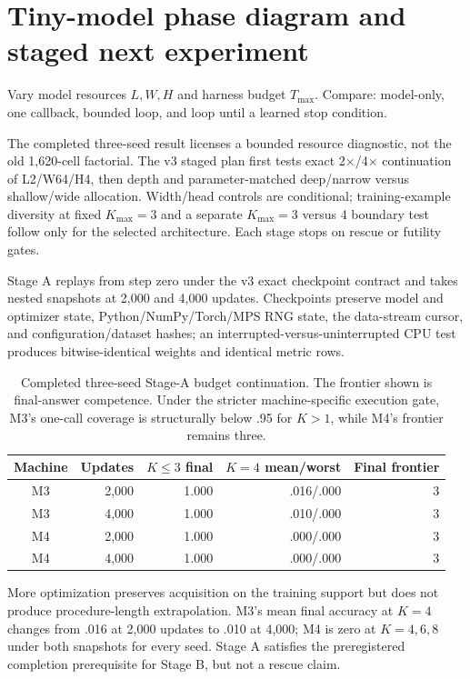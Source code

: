 \documentclass[10pt]{article}
\begin{document}
\section{Tiny-model phase diagram and staged next experiment}
Vary model resources \(L,W,H\) and harness budget \(T_{\max}\). Compare:
model-only, one callback, bounded loop, and loop until a learned stop condition.

The completed three-seed result licenses a bounded resource diagnostic, not the old 1,620-cell factorial. The v3 staged plan first tests exact 2$\times$/4$\times$ continuation of L2/W64/H4, then depth and parameter-matched deep/narrow versus shallow/wide allocation. Width/head controls are conditional; training-example diversity at fixed $K_{\max}=3$ and a separate $K_{\max}=3$ versus 4 boundary test follow only for the selected architecture. Each stage stops on rescue or futility gates.

Stage A replays from step zero under the v3 exact checkpoint contract and takes nested snapshots at 2,000 and 4,000 updates. Checkpoints preserve model and optimizer state, Python/NumPy/Torch/MPS RNG state, the data-stream cursor, and configuration/dataset hashes; an interrupted-versus-uninterrupted CPU test produces bitwise-identical weights and identical metric rows.

\begin{table}[H]\centering\small
\begin{tabular}{crrrr}
\toprule
Machine & Updates & $K\le3$ final & $K=4$ mean/worst & Final frontier\\\midrule
M3 & 2,000 & 1.000 & .016/.000 & 3\\
M3 & 4,000 & 1.000 & .010/.000 & 3\\
M4 & 2,000 & 1.000 & .000/.000 & 3\\
M4 & 4,000 & 1.000 & .000/.000 & 3\\
\bottomrule
\end{tabular}
\caption{Completed three-seed Stage-A budget continuation. The frontier shown is final-answer competence. Under the stricter machine-specific execution gate, M3's one-call coverage is structurally below .95 for $K>1$, while M4's frontier remains three.}
\label{tab:stage-a}
\end{table}

More optimization preserves acquisition on the training support but does not produce procedure-length extrapolation. M3's mean final accuracy at $K=4$ changes from .016 at 2,000 updates to .010 at 4,000; M4 is zero at $K=4,6,8$ under both snapshots for every seed. Stage A satisfies the preregistered completion prerequisite for Stage B, but not a rescue claim.
\end{document}
